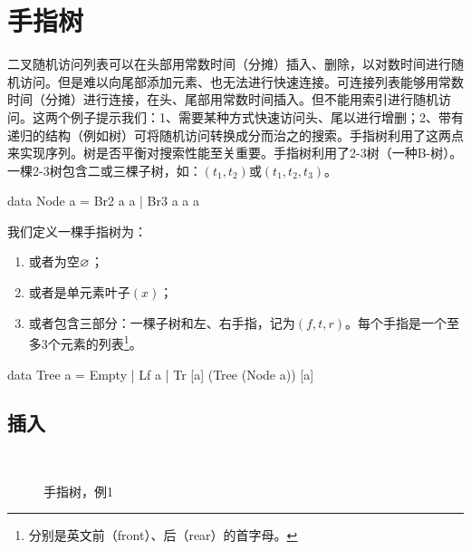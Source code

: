 \documentclass[b5paper]{ctexart}
\begin{document}
\section{手指树}

二叉随机访问列表可以在头部用常数时间（分摊）插入、删除，以对数时间进行随机访问。但是难以向尾部添加元素、也无法进行快速连接。可连接列表能够用常数时间（分摊）进行连接，在头、尾部用常数时间插入。但不能用索引进行随机访问。这两个例子提示我们：1、需要某种方式快速访问头、尾以进行增删；2、带有递归的结构（例如树）可将随机访问转换成分而治之的搜索。手指树\cite{finger-tree-1977}利用了这两点来实现序列\cite{finger-tree-2006}。树是否平衡对搜索性能至关重要。手指树利用了2-3树（一种B-树）。一棵2-3树包含二或三棵子树，如：$(t_1, t_2)$或$(t_1, t_2, t_3)$。

\begin{Haskell}
data Node a = Br2 a a | Br3 a a a
\end{Haskell}

我们定义一棵手指树为：

\begin{enumerate}
\item 或者为空$\varnothing$；
\item 或者是单元素叶子$(x)$；
\item 或者包含三部分：一棵子树和左、右手指，记为$(f, t, r)$。每个手指是一个至多3个元素的列表\footnote{分别是英文前（front）、后（rear）的首字母。}。
\end{enumerate}

\begin{Haskell}
data Tree a = Empty
            | Lf a
            | Tr [a] (Tree (Node a)) [a]
\end{Haskell}

\subsection{插入}

\begin{figure}[htbp]
  \centering
   \\
  \caption{手指树，例1}
  \label{fig:ftr-example-1}
\end{figure}
\end{document}
